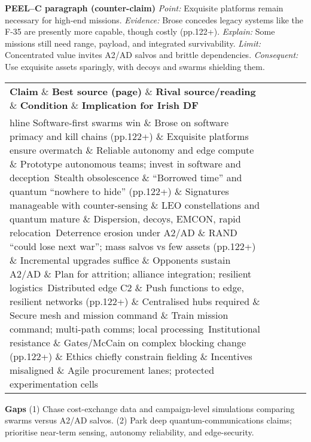\textbf{PEEL–C paragraph (counter-claim)}
\textit{Point:} Exquisite platforms remain necessary for high-end missions.
\textit{Evidence:} Brose concedes legacy systems like the F-35 are presently more capable, though costly (pp.122+).
\textit{Explain:} Some missions still need range, payload, and integrated survivability.
\textit{Limit:} Concentrated value invites A2/AD salvos and brittle dependencies.
\textit{Consequent:} Use exquisite assets sparingly, with decoys and swarms shielding them.

 
\begin{tabular}{p{3.2cm}p{4.2cm}p{3.6cm}p{3.2cm}p{4.2cm}}
	\textbf{Claim} \& \textbf{Best source (page)} \& \textbf{Rival source/reading} \& \textbf{Condition} \& \textbf{Implication for Irish DF}\\hline
	Software-first swarms win \& Brose on software primacy and kill chains (pp.122+) \& Exquisite platforms ensure overmatch \& Reliable autonomy and edge compute \& Prototype autonomous teams; invest in software and deception\
	Stealth obsolescence \& “Borrowed time” and quantum “nowhere to hide” (pp.122+) \& Signatures manageable with counter-sensing \& LEO constellations and quantum mature \& Dispersion, decoys, EMCON, rapid relocation\
	Deterrence erosion under A2/AD \& RAND “could lose next war”; mass salvos vs few assets (pp.122+) \& Incremental upgrades suffice \& Opponents sustain A2/AD \& Plan for attrition; alliance integration; resilient logistics\
	Distributed edge C2 \& Push functions to edge, resilient networks (pp.122+) \& Centralised hubs required \& Secure mesh and mission command \& Train mission command; multi-path comms; local processing\
	Institutional resistance \& Gates/McCain on complex blocking change (pp.122+) \& Ethics chiefly constrain fielding \& Incentives misaligned \& Agile procurement lanes; protected experimentation cells\
\end{tabular}

\textbf{Gaps}
(1) Chase cost-exchange data and campaign-level simulations comparing swarms versus A2/AD salvos.
(2) Park deep quantum-communications claims; prioritise near-term sensing, autonomy reliability, and edge-security.

\parencite{COHEN_1995}

